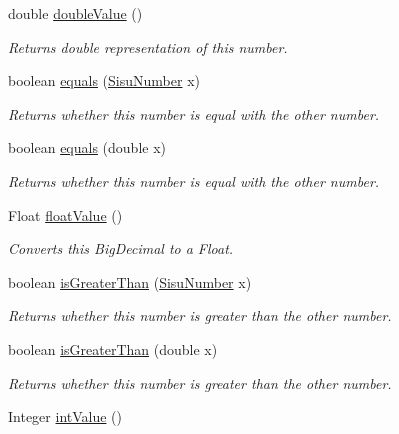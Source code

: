\begin{DoxyCompactItemize}
double \hyperlink{classcom_1_1aarrelaakso_1_1drawl_1_1_sisu_number_a2ec0d89a34f60f2283ea189a1ae951c1}{double\+Value} ()
\begin{DoxyCompactList}\small\item\em Returns double representation of this number. \end{DoxyCompactList}\item 
boolean \hyperlink{classcom_1_1aarrelaakso_1_1drawl_1_1_sisu_number_a94ca38920f6c84224c0af76f12b6a171}{equals} (\hyperlink{classcom_1_1aarrelaakso_1_1drawl_1_1_sisu_number}{Sisu\+Number} x)
\begin{DoxyCompactList}\small\item\em Returns whether this number is equal with the other number. \end{DoxyCompactList}\item 
boolean \hyperlink{classcom_1_1aarrelaakso_1_1drawl_1_1_sisu_number_a96f08f16d1a09dbbf49bd8cf59cc6c41}{equals} (double x)
\begin{DoxyCompactList}\small\item\em Returns whether this number is equal with the other number. \end{DoxyCompactList}\item 
Float \hyperlink{classcom_1_1aarrelaakso_1_1drawl_1_1_sisu_number_a4c7db66d6d3016a3d10a1664b43117b9}{float\+Value} ()
\begin{DoxyCompactList}\small\item\em Converts this Big\+Decimal to a Float. \end{DoxyCompactList}\item 
boolean \hyperlink{classcom_1_1aarrelaakso_1_1drawl_1_1_sisu_number_a0e0b1e0730d5b34239b322c93865274d}{is\+Greater\+Than} (\hyperlink{classcom_1_1aarrelaakso_1_1drawl_1_1_sisu_number}{Sisu\+Number} x)
\begin{DoxyCompactList}\small\item\em Returns whether this number is greater than the other number. \end{DoxyCompactList}\item 
boolean \hyperlink{classcom_1_1aarrelaakso_1_1drawl_1_1_sisu_number_a41d3809a0fea924d08dcc1a14f866665}{is\+Greater\+Than} (double x)
\begin{DoxyCompactList}\small\item\em Returns whether this number is greater than the other number. \end{DoxyCompactList}\item 
Integer \hyperlink{classcom_1_1aarrelaakso_1_1drawl_1_1_sisu_number_aa47667c48867cb223722df6facb0da42}{int\+Value} ()

\end{DoxyCompactItemize}
